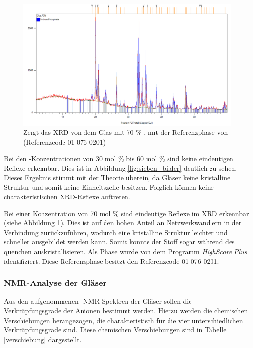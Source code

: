 \documentclass[12pt, a4paper]{article}
\begin{document}
\begin{figure}[!h]
  \centering
  \includegraphics[width=0.90\linewidth]{70pro.png}
  \caption{Zeigt das XRD von dem Glas mit 70 \% , mit der Referenzphase von  (Referenzcode 01-076-0201)}
    \label{70pro}
\end{figure}

\noindent
Bei den -Konzentrationen von 30 mol \% bis 60 mol \% sind keine eindeutigen Reflexe erkennbar. Dies ist in Abbildung \ref{fig:sieben_bilder} deutlich zu sehen. Dieses Ergebnis stimmt mit der Theorie überein, da Gläser keine kristalline Struktur und somit keine Einheitszelle besitzen. Folglich können keine charakteristischen XRD-Reflexe auftreten.


\noindent
Bei einer Konzentration von 70 mol \%  sind eindeutige Reflexe im XRD erkennbar (siehe Abbildung \ref{70pro}). 
Dies ist auf den hohen Anteil an Netzwerkwandlern in der Verbindung zurückzuführen, wodurch eine kristalline Struktur leichter und schneller ausgebildet werden kann. Somit konnte der Stoff sogar während des quenchen auskristallisieren.
Als Phase wurde von dem Programm \textit{HighScore Plus}  identifiziert. Diese Referenzphase besitzt den Referenzcode 01-076-0201.

\subsubsection{NMR-Analyse der Gläser}
Aus den aufgenommenen -NMR-Spektren der Gläser sollen die Verknüpfungsgrade der  Anionen bestimmt werden. Hierzu werden die chemischen Verschiebungen herangezogen, die charakteristisch für die vier unterschiedlichen Verknüpfungsgrade sind. Diese chemischen Verschiebungen sind in Tabelle \ref{verschiebung} dargestellt.

\renewcommand{\arraystretch}{1.3} %
\end{document}
